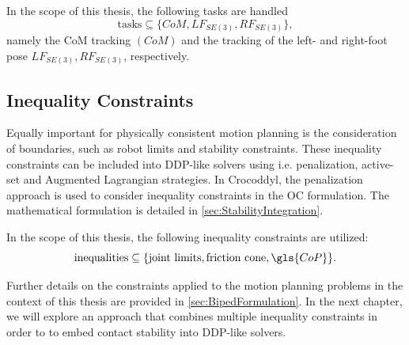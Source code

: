 In the scope of this thesis, the following tasks are handled
\begin{equation}
\text{tasks} \subseteq \{CoM, LF_{SE(3)}, RF_{SE(3)}\}, 
\end{equation}
namely the \gls{CoM} tracking $(CoM)$ and the tracking of the left- and right-foot pose $LF_{SE(3)}, RF_{SE(3)}$, respectively.

\subsection{Inequality Constraints}
Equally important for physically consistent motion planning is the consideration of boundaries, such as robot limits and stability constraints. These inequality constraints can be included into \gls{DDP}-like solvers using i.e. penalization, active-set \cite{xie2017differential} and Augmented Lagrangian \cite{howell2019altro} strategies. In Crocoddyl, the penalization approach is used to consider inequality constraints in the \gls{OC} formulation. The mathematical formulation is detailed in \cref{sec:StabilityIntegration}. 

In the scope of this thesis, the following inequality constraints are utilized:
\begin{equation}
\text{inequalities} \subseteq \{\text{joint limits}, \text{friction cone}, \gls{CoP}\}.
\end{equation}

Further details on the constraints applied to the motion planning problems in the context of this thesis are provided in \cref{sec:BipedFormulation}. In the next chapter, we will explore an approach that combines multiple inequality constraints in order to to embed contact stability into \gls{DDP}-like solvers. 